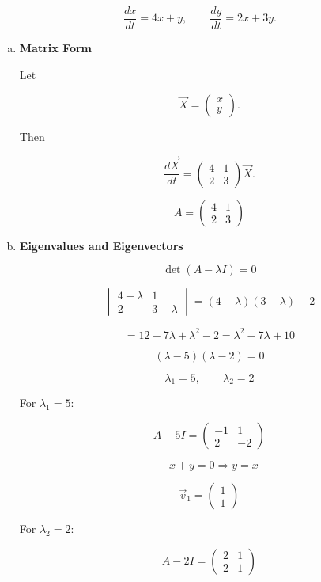 \documentclass[12pt]{article}
\begin{document}
\[
\frac{dx}{dt}=4x+y,
\qquad
\frac{dy}{dt}=2x+3y.
\]

\begin{enumerate}[a)]

\item \textbf{Matrix Form}

Let

\[
\vec{X}=
\begin{pmatrix}
x\\y
\end{pmatrix}.
\]

Then

\[
\frac{d\vec{X}}{dt}
=
\begin{pmatrix}
4&1\\
2&3
\end{pmatrix}
\vec{X}.
\]

\[
\boxed{
A=
\begin{pmatrix}
4&1\\
2&3
\end{pmatrix}}
\]

\item \textbf{Eigenvalues and Eigenvectors}

\[
\det(A-\lambda I)=0
\]

\[
\begin{vmatrix}
4-\lambda&1\\
2&3-\lambda
\end{vmatrix}
=
(4-\lambda)(3-\lambda)-2
\]

\[
=12-7\lambda+\lambda^2-2
=\lambda^2-7\lambda+10
\]

\[
(\lambda-5)(\lambda-2)=0
\]

\[
\boxed{\lambda_1=5,\qquad \lambda_2=2}
\]

For \(\lambda_1=5\):

\[
A-5I=
\begin{pmatrix}
-1&1\\
2&-2
\end{pmatrix}
\]

\[
-x+y=0 \Rightarrow y=x
\]

\[
\boxed{
\vec v_1=
\begin{pmatrix}
1\\1
\end{pmatrix}}
\]

For \(\lambda_2=2\):

\[
A-2I=
\begin{pmatrix}
2&1\\
2&1
\end{pmatrix}
\]


\end{enumerate}
\end{document}
